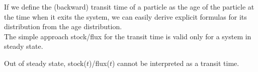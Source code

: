If we define the (backward) transit time of a particle as the age of the particle 
at the time when it exits the system, we can easily derive explicit formulas for its distribution 
from the age distribution.\\
The simple approach stock/flux for the transit time is valid only for a system in steady state.

{\color{red}Out of steady state, stock($t$)/flux($t$) cannot be interpreted as a transit time.}
\vspace{.5cm}

